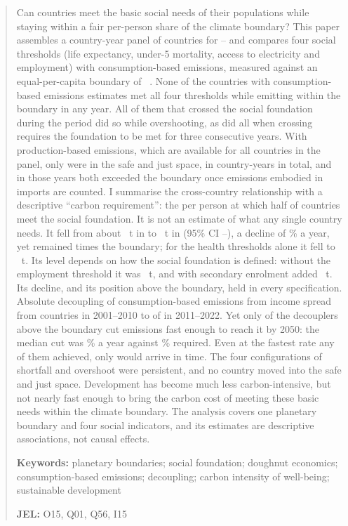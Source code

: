 \begin{abstract}
\noindent
Can countries meet the basic social needs of their populations while staying within a fair per-person share of the climate boundary? This paper assembles a country-year panel of \nNCountries{} countries for \nFirstYear--\nLastYear{} and compares four social thresholds (life expectancy, under-5 mortality, access to electricity and employment) with consumption-based \COtwo{} emissions, measured against an equal-per-capita boundary of \nBoundary~\tpc. None of the \nNCons{} countries with consumption-based emissions estimates met all four thresholds while emitting within the boundary in any year. All \nNCrossers{} of them that crossed the social foundation during the period did so while overshooting, as did all \nNCrossersSust{} when crossing requires the foundation to be met for three consecutive years. With production-based emissions, which are available for all \nNCountries{} countries in the panel, only \nProdSafeCountriesAll{} were in the safe and just space, in \nProdSafeYearsAll{} country-years in total, and in those years both exceeded the boundary once emissions embodied in imports are counted. I summarise the cross-country relationship with a descriptive ``carbon requirement'': the \COtwo{} per person at which half of countries meet the social foundation. It is not an estimate of what any single country needs. It fell from about \nReqStart~t in \nShareYearStart{} to \nReqEnd~t in \nLastYear{} (95\% CI \nReqEndLo--\nReqEndHi), a decline of \nReqTrend\% a year, yet remained \nReqEndMultiple{} times the boundary; for the health thresholds alone it fell to \nReqHealthEnd~t. Its level depends on how the social foundation is defined: without the employment threshold it was \nRobReqNoEmp~t, and with secondary enrolment added \nRobReqEdu~t. Its decline, and its position above the boundary, held in every specification. Absolute decoupling of consumption-based emissions from income spread from \nDecAbsEarly{} countries in 2001--2010 to \nDecAbsLate{} of \nDecN{} in 2011--2022. Yet only \nDecAboveOnTrack{} of the \nDecAbsAbove{} decouplers above the boundary cut emissions fast enough to reach it by 2050: the median cut was \nDecMedianAchieved\% a year against \nDecMedianRequired\% required. Even at the fastest rate any of them achieved, only \nScenFastest{} would arrive in time. The four configurations of shortfall and overshoot were persistent, and no country moved into the safe and just space. Development has become much less carbon-intensive, but not nearly fast enough to bring the carbon cost of meeting these basic needs within the climate boundary. The analysis covers one planetary boundary and four social indicators, and its estimates are descriptive associations, not causal effects.

\medskip
\noindent\textbf{Keywords:} planetary boundaries; social foundation; doughnut economics; consumption-based emissions; decoupling; carbon intensity of well-being; sustainable development

\medskip
\noindent\textbf{JEL:} O15, Q01, Q56, I15
\end{abstract}
